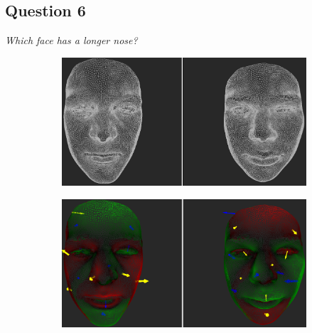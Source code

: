 \subsection{Question 6}
\label{attch:complete_study_results-question6}

\begin{center}{\it Which face has a longer nose?}\end{center}

\begin{figure}[h]
\centering
\begin{subfigure}{0.49\textwidth}
\includegraphics[width=\textwidth]{./img-study/pair13.PNG}
\caption{}
\label{fig:study-5-13}
\end{subfigure}
\begin{subfigure}{0.49\textwidth}
\includegraphics[width=\textwidth]{./img-study/pair11.PNG}
\caption{}
\label{fig:study-5-11}
\end{subfigure}


\end{figure}
